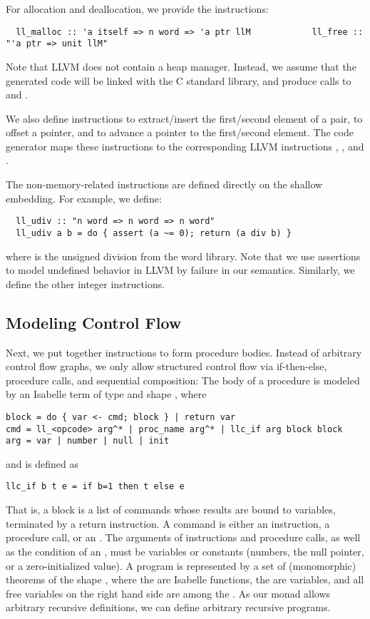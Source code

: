 \documentclass[a4paper,oribibl,envcountsame]{llncs}
\begin{document}
For allocation and deallocation, we provide the instructions:
\begin{lstlisting}
  ll_malloc :: 'a itself => n word => 'a ptr llM            ll_free :: "'a ptr => unit llM"
\end{lstlisting}
Note that LLVM does not contain a heap manager. 
Instead, we assume that the generated code will be linked with the C standard library, 
and produce calls to  and .

We also define
instructions to extract/insert the first/second element of a pair, to offset a pointer, and to advance a pointer to the first/second element.
The code generator maps these instructions to the corresponding LLVM instructions , , and .

The non-memory-related instructions are defined directly on the shallow embedding. For example, we define:
\begin{lstlisting}
  ll_udiv :: "n word => n word => n word"
  ll_udiv a b = do { assert (a ~= 0); return (a div b) }
\end{lstlisting}
where  is the unsigned division from the word library.
Note that we use assertions to model undefined behavior in LLVM by failure in our semantics.
Similarly, we define the other integer instructions.

\subsection{Modeling Control Flow}\label{sec:modeling_ctrl_flow}
Next, we put together instructions to form procedure bodies. Instead of arbitrary control flow graphs, 
we only allow structured control flow via if-then-else, procedure calls, and sequential composition: The body of
a procedure is modeled by an Isabelle term of type  and shape , where
\begin{lstlisting}
block = do { var <- cmd; block } | return var
cmd = ll_<opcode> arg^* | proc_name arg^* | llc_if arg block block
arg = var | number | null | init
\end{lstlisting}
and  is defined as
\begin{lstlisting}
llc_if b t e = if b=1 then t else e
\end{lstlisting}
That is, a block is a list of commands whose results are bound to variables, terminated by a return instruction. 
A command is either an instruction, a procedure call, or an . 
The arguments of instructions and procedure calls, as well as the condition of an , must be variables or constants (numbers, the null pointer, or a zero-initialized value).
%
A program is represented by a set of (monomorphic) theorems of the shape
,
where the  are Isabelle functions, the  are variables, and all free variables on the right hand side are among the .
As our monad allows arbitrary recursive definitions, we can define arbitrary recursive programs.
\end{document}
